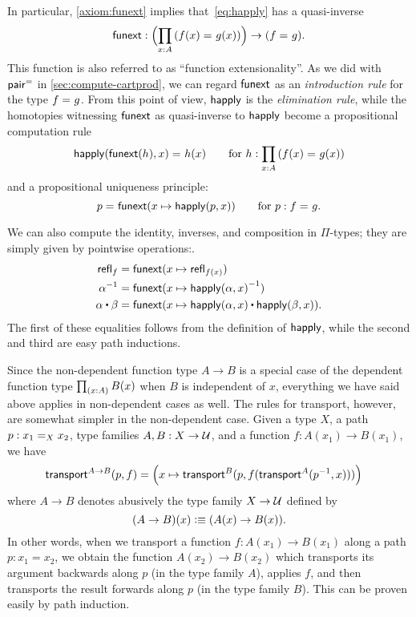 In particular, \cref{axiom:funext} implies that~\eqref{eq:happly} has a quasi-inverse
\[
\funext : \Parens{\prd{x:A} (\id{f(x)}{g(x)})} \to {(\id{f}{g})}.
\]
This function is also referred to as ``function extensionality''.
As we did with $\pairpath$ in \cref{sec:compute-cartprod}, we can regard $\funext$ as an \emph{introduction rule} for the type $\id f g$.
From this point of view, $\happly$ is the \emph{elimination rule}, while the homotopies witnessing $\funext$ as quasi-inverse to $\happly$ become a propositional computation rule
\[
\id{\happly({\funext{(h)}},x)}{h(x)} \qquad\text{for }h:\prd{x:A} (\id{f(x)}{g(x)})
\]
and a propositional uniqueness principle:
\[
\id{p}{\funext (x \mapsto \happly(p,{x}))} \qquad\text{for } p: \id f g.
\]

We can also compute the identity, inverses, and composition in $\Pi$-types; they are simply given by pointwise operations:.
\begin{align*}
\refl{f} &= \funext(x \mapsto \refl{f(x)}) \\
\opp{\alpha} &= \funext (x \mapsto \opp{\happly (\alpha,x)})  \\
{\alpha} \ct \beta &= \funext (x \mapsto {\happly({\alpha},x) \ct \happly({\beta},x)}).
\end{align*}
The first of these equalities follows from the definition of $\happly$, while the second and third are easy path inductions.

Since the non-dependent function type $A\to B$ is a special case of the dependent function type $\prd{x:A} B(x)$ when $B$ is independent of $x$, everything we have said above applies in non-dependent cases as well.
%
The rules for transport, however, are somewhat simpler in the non-dependent case.
Given a type $X$, a path $p:\id[X]{x_1}{x_2}$, type families $A,B:X\to \type$, and a function $f : A(x_1) \to B(x_1)$,  we have
\begin{align}\label{eq:transport-arrow}
  \transfib{A\to B}{p}{f} &=
  \Big(x \mapsto \transfib{B}{p}{f(\transfib{A}{\opp p}{x})}\Big)
\end{align}
where $A\to B$ denotes abusively the type family $X\to \type$ defined by
\[(A\to B)(x) \defeq (A(x)\to B(x)).\]
In other words, when we transport a function $f:A(x_1)\to B(x_1)$ along a path $p:x_1=x_2$, we obtain the function $A(x_2)\to B(x_2)$ which transports its argument backwards along $p$ (in the type family $A$), applies $f$, and then transports the result forwards along $p$ (in the type family $B$).
This can be proven easily by path induction.

